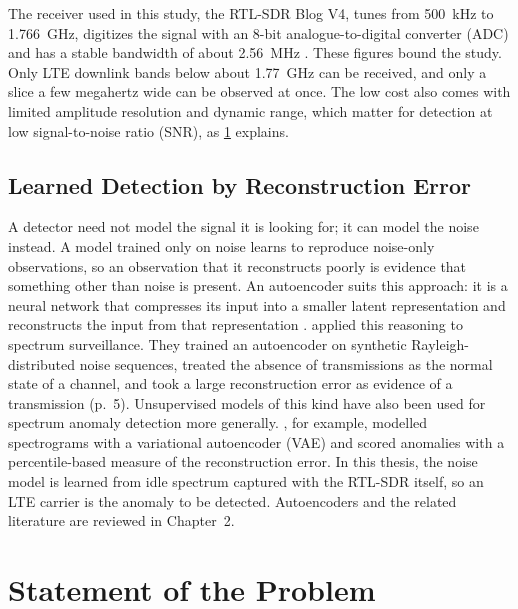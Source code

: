 The receiver used in this study, the RTL-SDR Blog V4, tunes from \qty{500}{\kilo\hertz} to \qty{1.766}{\giga\hertz}, digitizes the signal with an 8-bit analogue-to-digital converter (ADC) and has a stable bandwidth of about \qty{2.56}{\mega\hertz} \parencite{rtlsdrblog2024}. These figures bound the study. Only LTE downlink bands below about \qty{1.77}{\giga\hertz} can be received, and only a slice a few megahertz wide can be observed at once. The low cost also comes with limited amplitude resolution and dynamic range, which matter for detection at low signal-to-noise ratio (SNR), as \cref{sec:problem} explains.

\subsection{Learned Detection by Reconstruction Error}
\label{sec:learned-detection}

A detector need not model the signal it is looking for; it can model the noise instead. A model trained only on noise learns to reproduce noise-only observations, so an observation that it reconstructs poorly is evidence that something other than noise is present. An autoencoder suits this approach: it is a neural network that compresses its input into a smaller latent representation and reconstructs the input from that representation \parencite[pp.~2--3]{torio2025}. \Textcite{torio2025} applied this reasoning to spectrum surveillance. They trained an autoencoder on synthetic Rayleigh-distributed noise sequences, treated the absence of transmissions as the normal state of a channel, and took a large reconstruction error as evidence of a transmission (p.~5). Unsupervised models of this kind have also been used for spectrum anomaly detection more generally. \Textcite{tian2022}, for example, modelled spectrograms with a variational autoencoder (VAE) and scored anomalies with a percentile-based measure of the reconstruction error. In this thesis, the noise model is learned from idle spectrum captured with the RTL-SDR itself, so an LTE carrier is the anomaly to be detected. Autoencoders and the related literature are reviewed in Chapter~2.

\section{Statement of the Problem}
\label{sec:problem}

